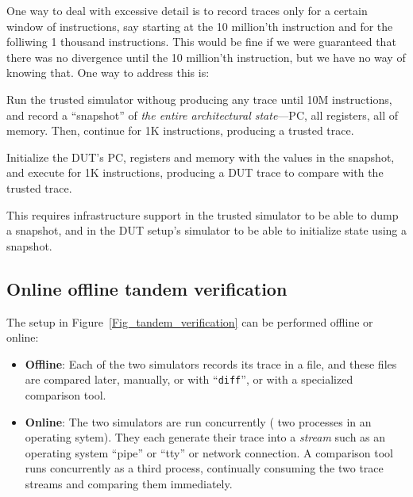 One way to deal with excessive detail is to record traces only for a
certain window of instructions, say starting at the 10 million'th
instruction and for the folliwing 1 thousand instructions.  This would
be fine if we were guaranteed that there was no divergence until the
10 million'th instruction, but we have no way of knowing that.  One
way to address this is:

\begin{tightlist}

 \item Run the trusted simulator withoug producing any trace until 10M
       instructions, and record a ``snapshot'' of \emph{the entire
       architectural state}---PC, all registers, all of memory.  Then,
       continue for 1K instructions, producing a trusted trace.

 \item Initialize the DUT's PC, registers and memory with the values
       in the snapshot, and execute for 1K instructions, producing a
       DUT trace to compare with the trusted trace.

\end{tightlist}

This requires infrastructure support in the trusted simulator to be
able to dump a snapshot, and in the DUT setup's simulator to be able
to initialize state using a snapshot.


\subsection{Online {\vs} offline tandem verification}

The setup in Figure~\ref{Fig_tandem_verification} can be performed
offline or online:

\begin{itemize}

 \item {\bf Offline}: Each of the two simulators records its trace in
       a file, and these files are compared later, manually, or with
       ``{\tt diff}'', or with a specialized comparison tool.

 \item {\bf Online}: The two simulators are run concurrently ({\eg}
       two processes in an operating sytem).  They each generate their
       trace into a \emph{stream} such as an operating system ``pipe''
       or ``tty'' or network connection.  A comparison tool runs
       concurrently as a third process, continually consuming the two
       trace streams and comparing them immediately.

\end{itemize}

